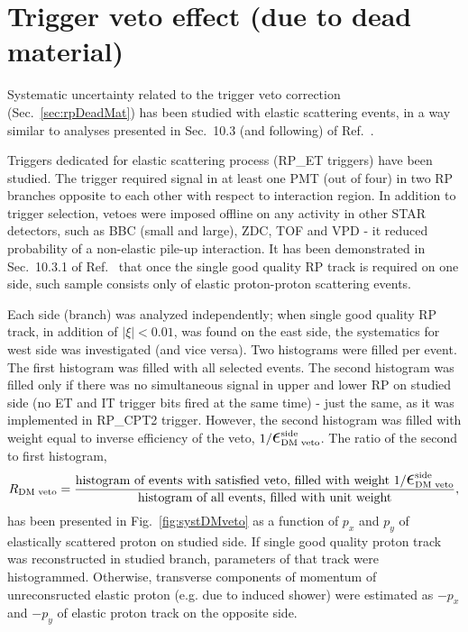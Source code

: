 \section{Trigger veto effect (due to dead material)}\label{sec:systTrigVeto}

Systematic uncertainty related to the trigger veto correction (Sec.~\ref{sec:rpDeadMat}) has been studied with elastic scattering events, in a way similar to analyses presented in Sec.~10.3 (and following) of Ref.~\cite{supplementaryNote}. 

Triggers dedicated for elastic scattering process (RP\_ET triggers) have been studied. The trigger required signal in at least one PMT (out of four) in two RP branches opposite to each other with respect to interaction region. In addition to trigger selection, vetoes were imposed offline on any activity in other STAR detectors, such as BBC (small and large), ZDC, TOF and VPD - it reduced probability of a non-elastic pile-up interaction. It has been demonstrated in Sec.~10.3.1 of Ref.~\cite{supplementaryNote} that once the single good quality RP track is required on one side, such sample consists only of elastic proton-proton scattering events.

Each side (branch) was analyzed independently; when single good quality RP track, in addition of $|\xi|<0.01$, was found on the east side, the systematics for west side was investigated (and vice versa). Two histograms were filled per event. The first histogram was filled with all selected events. The second histogram was filled only if there was no simultaneous signal in upper and lower RP on studied side (no ET and IT trigger bits fired at the same time) - just the same, as it was implemented in RP\_CPT2 trigger. However, the second histogram was filled with weight equal to inverse efficiency of the veto, $1/\mbox{\LARGE$\epsilon$}_{\text{DM~veto}}^{\text{side}}$. The ratio of the second to first histogram,
\begin{equation}
 R_{\text{DM~veto}} = \frac{\text{histogram of events with satisfied veto, filled with weight } 1/\mbox{\LARGE$\epsilon$}_{\text{DM~veto}}^{\text{side}}}{\text{histogram of all events, filled with unit weight}},
\end{equation}
has been presented in Fig.~\ref{fig:systDMveto} as a function of $p_{x}$ and $p_{y}$ of elastically scattered proton on studied side. If single good quality proton track was reconstructed in studied branch, parameters of that track were histogrammed. Otherwise, transverse components of momentum of unreconsructed elastic proton (e.g. due to induced shower) were estimated as $-p_{x}$ and $-p_{y}$ of elastic proton track on the opposite side.

